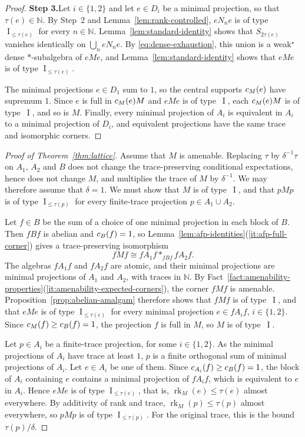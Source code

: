 \documentclass[11pt]{amsart}
\makeatletter
\numberwithin{equation}{section}
\newcommand{\nn}{\mathbb N}
\DeclareMathOperator{\I}{I}
\DeclareMathOperator{\rk}{rk}
\newcommand{\@optsub}[1]{\if\relax\detokenize{#1}\relax\else_{#1}\fi}
\newcommand{\csupp}[2][]{c\@optsub{#1}(#2)}
\theoremstyle{definition}
\makeatother
\begin{document}
\begin{proof}
    \smallskip
    \noindent\textbf{Step 3.}\enspace Let $i\in\{1,2\}$ and let $e\in D_i$ be a minimal projection, so that $\tau(e)\in\nn$. By Step~2 and Lemma~\ref{lem:rank-controlled}, $eN_ne$ is of type $\I_{\leq\tau(e)}$ for every $n\in\nn$. Lemma~\ref{lem:standard-identity} shows that $S_{2\tau(e)}$ vanishes identically on $\bigcup_neN_ne$. By \eqref{eq:dense-exhaustion}, this union is a weak$^\star$ dense $*$-subalgebra of $eMe$, and Lemma~\ref{lem:standard-identity} shows that $eMe$ is of type $\I_{\leq\tau(e)}$.

    The minimal projections $e\in D_1$ sum to $1$, so the central supports $\csupp[M]{e}$ have supremum $1$. Since $e$ is full in $\csupp[M]{e}M$ and $eMe$ is of type~$\I$, each $\csupp[M]{e}M$ is of type~$\I$, and so is $M$. Finally, every minimal projection of $A_i$ is equivalent in $A_i$ to a minimal projection of $D_i$, and equivalent projections have the same trace and isomorphic corners.
\end{proof}

\begin{proof}[Proof of Theorem~\ref{thm:lattice}]
    Assume that $M$ is amenable. Replacing $\tau$ by $\delta^{-1}\tau$ on $A_1$, $A_2$ and $B$ does not change the trace-preserving conditional expectations, hence does not change $M$, and multiplies the trace of $M$ by $\delta^{-1}$. We may therefore assume that $\delta=1$. We must show that $M$ is of type~$\I$, and that $pMp$ is of type $\I_{\leq\tau(p)}$ for every finite-trace projection $p\in A_1\cup A_2$.

    Let $f\in B$ be the sum of a choice of one minimal projection in each block of $B$. Then $fBf$ is abelian and $\csupp[B]{f}=1$, so Lemma~\ref{lem:afp-identities}\textup{(\ref*{it:afp-full-corner})} gives a trace-preserving isomorphism
    $$
        fMf\cong fA_1f\ast_{fBf}fA_2f.
    $$
    The algebras $fA_1f$ and $fA_2f$ are atomic, and their minimal projections are minimal projections of $A_1$ and $A_2$, with traces in $\nn$. By Fact~\ref{fact:amenability-properties}\textup{(\ref*{it:amenability-expected-corners})}, the corner $fMf$ is amenable. Proposition~\ref{prop:abelian-amalgam} therefore shows that $fMf$ is of type~$\I$, and that $eMe$ is of type $\I_{\leq\tau(e)}$ for every minimal projection $e\in fA_if$, $i\in\{1,2\}$. Since $\csupp[M]{f}\geq\csupp[B]{f}=1$, the projection $f$ is full in $M$, so $M$ is of type~$\I$.

    Let $p\in A_i$ be a finite-trace projection, for some $i\in\{1,2\}$. As the minimal projections of $A_i$ have trace at least $1$, $p$ is a finite orthogonal sum of minimal projections of $A_i$. Let $e\in A_i$ be one of them. Since $\csupp[A_i]{f}\geq\csupp[B]{f}=1$, the block of $A_i$ containing $e$ contains a minimal projection of $fA_if$, which is equivalent to $e$ in $A_i$. Hence $eMe$ is of type $\I_{\leq\tau(e)}$, that is, $\rk_M(e)\leq\tau(e)$ almost everywhere. By additivity of rank and trace, $\rk_M(p)\leq\tau(p)$ almost everywhere, so $pMp$ is of type $\I_{\leq\tau(p)}$. For the original trace, this is the bound $\tau(p)/\delta$.
\end{proof}
\end{document}
